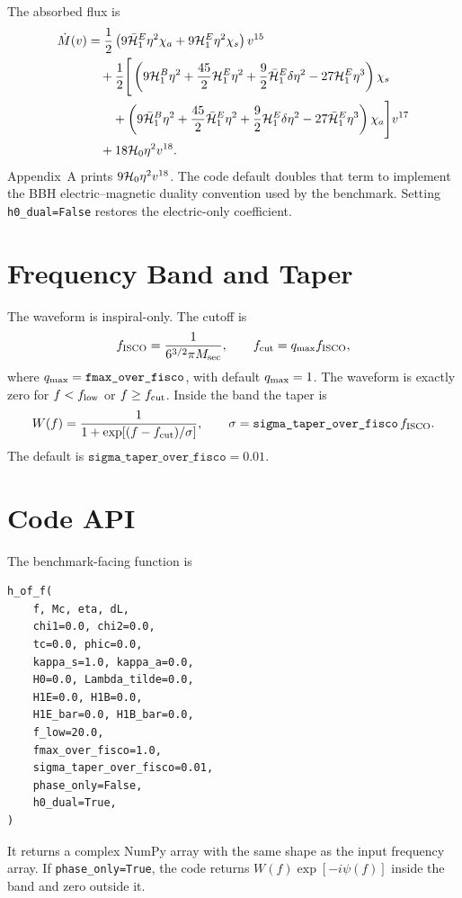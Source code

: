 \documentclass[11pt]{article}
\begin{document}
The absorbed flux is
\begin{align}
\dot M(v)
&=
\frac{1}{2}
\left(
9\bar{\cal H}_1^E\eta^2\chi_a
+9{\cal H}_1^E\eta^2\chi_s
\right)v^{15}
\nonumber\\
&\quad
+\frac{1}{2}\Bigg[
\left(
9{\cal H}_1^B\eta^2
+\frac{45}{2}{\cal H}_1^E\eta^2
+\frac{9}{2}\bar{\cal H}_1^E\delta\eta^2
-27{\cal H}_1^E\eta^3
\right)\chi_s
\nonumber\\
&\qquad
+\left(
9\bar{\cal H}_1^B\eta^2
+\frac{45}{2}\bar{\cal H}_1^E\eta^2
+\frac{9}{2}{\cal H}_1^E\delta\eta^2
-27\bar{\cal H}_1^E\eta^3
\right)\chi_a
\Bigg]v^{17}
\nonumber\\
&\quad
+18{\cal H}_0\eta^2v^{18}.
  \label{eq:mdot-code}
\end{align}
Appendix~A prints \(9{\cal H}_0\eta^2v^{18}\).  The code default doubles that
term to implement the BBH electric--magnetic duality convention used by the
benchmark.  Setting \texttt{h0\_dual=False} restores the electric-only
coefficient.

\section{Frequency Band and Taper}

The waveform is inspiral-only.  The cutoff is
\begin{equation}
  f_{\rm ISCO}=\frac{1}{6^{3/2}\pi M_{\rm sec}},
  \qquad
  f_{\rm cut}=q_{\rm max}f_{\rm ISCO},
\end{equation}
where \(q_{\rm max}=\texttt{fmax\_over\_fisco}\), with default \(q_{\rm max}=1\).
The waveform is exactly zero for \(f<f_{\rm low}\) or \(f\ge f_{\rm cut}\).
Inside the band the taper is
\begin{equation}
  W(f)
  =
  \frac{1}{1+\exp[(f-f_{\rm cut})/\sigma]},
  \qquad
  \sigma=
  \texttt{sigma\_taper\_over\_fisco}\,f_{\rm ISCO}.
\end{equation}
The default is \(\texttt{sigma\_taper\_over\_fisco}=0.01\).

\section{Code API}

The benchmark-facing function is
\begin{verbatim}
h_of_f(
    f, Mc, eta, dL,
    chi1=0.0, chi2=0.0,
    tc=0.0, phic=0.0,
    kappa_s=1.0, kappa_a=0.0,
    H0=0.0, Lambda_tilde=0.0,
    H1E=0.0, H1B=0.0,
    H1E_bar=0.0, H1B_bar=0.0,
    f_low=20.0,
    fmax_over_fisco=1.0,
    sigma_taper_over_fisco=0.01,
    phase_only=False,
    h0_dual=True,
)
\end{verbatim}
It returns a complex NumPy array with the same shape as the input frequency
array.  If \texttt{phase\_only=True}, the code returns
\(W(f)\exp[-i\psi(f)]\) inside the band and zero outside it.
\end{document}
